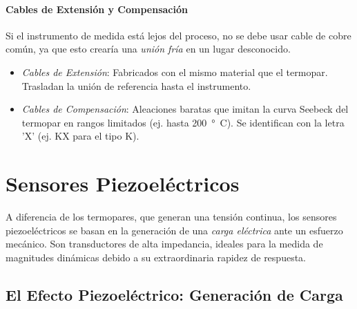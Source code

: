 \paragraph{Cables de Extensión y Compensación}
Si el instrumento de medida está lejos del proceso, no se debe usar cable de cobre común, ya que esto crearía una \emph{unión fría} en un lugar desconocido.
\begin{itemize}
    \item \emph{Cables de Extensión}: Fabricados con el mismo material que el termopar. Trasladan la unión de referencia hasta el instrumento.
    \item \emph{Cables de Compensación}: Aleaciones baratas que imitan la curva Seebeck del termopar en rangos limitados (ej. hasta \qty{200}{\degree C}). Se identifican con la letra 'X' (ej. KX para el tipo K).
\end{itemize}


\section{Sensores Piezoeléctricos}\label{sec:piezoelectricos}

A diferencia de los termopares, que generan una tensión continua, los sensores piezoeléctricos se basan en la generación de una \emph{carga eléctrica} ante un esfuerzo mecánico. Son transductores de alta impedancia, ideales para la medida de magnitudes dinámicas debido a su extraordinaria rapidez de respuesta.



\subsection{El Efecto Piezoeléctrico: Generación de Carga}

